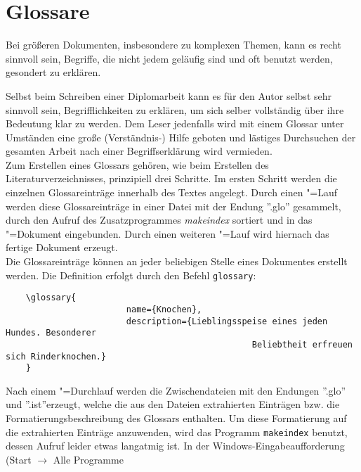 %
%

\section{Glossare}
\label{sec:glossar}

Bei größeren Dokumenten, insbesondere zu komplexen Themen, kann es recht
sinnvoll sein, Begriffe, die nicht jedem geläufig sind und oft benutzt
werden, gesondert zu erklären.

Selbst beim Schreiben einer Diplomarbeit kann es für den Autor selbst
sehr sinnvoll sein, Begrifflichkeiten zu erklären, um sich selber vollständig
über ihre Bedeutung klar zu werden. Dem Leser jedenfalls wird mit einem Glossar
unter Umständen eine große (Verständnis-) Hilfe geboten und lästiges
Durchsuchen der gesamten Arbeit nach einer Begriffserklärung wird vermieden.
\vspace{1em}
\\
Zum Erstellen eines Glossars gehören, wie beim Erstellen des Literaturverzeichnisses,
 prinzipiell drei Schritte.
Im ersten Schritt werden die einzelnen Glossareinträge innerhalb des Textes
angelegt. Durch einen \DMLLaTeX"=Lauf werden diese Glossareinträge in
einer Datei mit der Endung ''.glo'' gesammelt, durch den Aufruf des
Zusatzprogrammes \emph{makeindex} sortiert und in das \DMLLaTeX"=Dokument
eingebunden. Durch einen weiteren \DMLLaTeX"=Lauf wird hiernach das fertige
Dokument erzeugt.
\vspace{1em}
\\
Die Glossareinträge können an jeder beliebigen Stelle eines Dokumentes erstellt werden.
Die Definition erfolgt durch den Befehl \texttt{glossary}:
\begin{verbatim}
	\glossary{
						name={Knochen},
						description={Lieblingsspeise eines jeden Hundes. Besonderer
												 Beliebtheit erfreuen sich Rinderknochen.}
	}
\end{verbatim}
Nach einem  \DMLLaTeX"=Durchlauf werden die Zwischendateien mit den Endungen ''.glo'' und
''.ist''erzeugt, welche die aus den Dateien extrahierten Einträgen bzw. die
Formatierungsbeschreibung des Glossars enthalten. Um diese Formatierung auf die extrahierten
Einträge anzuwenden, wird das Programm \texttt{makeindex} benutzt, dessen Aufruf leider
etwas langatmig ist. In der Windows-Eingabeaufforderung (Start $\rightarrow$ Alle Programme
